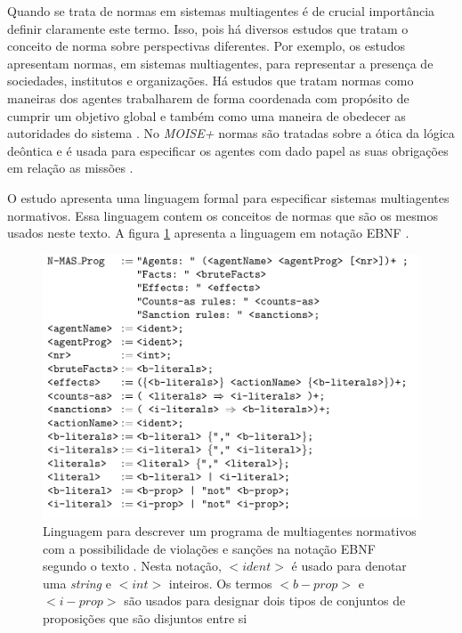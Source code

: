 Quando se trata de normas em sistemas multiagentes é de crucial importância definir claramente este termo. Isso, pois há diversos estudos que tratam o conceito de norma sobre perspectivas diferentes. Por exemplo, os estudos \cite{formalizeagent} \cite{formalizeagent2} apresentam normas, em sistemas multiagentes, para representar a presença de sociedades, institutos e organizações. Há estudos que tratam normas como maneiras dos agentes trabalharem de forma coordenada com propósito de cumprir um objetivo global e também como uma maneira de obedecer as autoridades do sistema \cite{modelingnormsforautnomousagent} \cite{amodelmultiagentsystemdynamicrelationship}. No \textit{MOISE+} normas são tratadas sobre a ótica da lógica deôntica e é usada para especificar os agentes com dado papel as suas obrigações em relação as missões \cite{moiseframework} \cite{moiseframeworktwo}.

O estudo \cite{dastaniframework} apresenta uma linguagem formal para especificar sistemas multiagentes normativos. Essa linguagem contem os conceitos de normas que são os mesmos usados neste texto. A figura \ref{descreveprograma} apresenta a linguagem em notação EBNF \cite{dastaniframework}.

\begin{figure}[H]
  \centering
  \includegraphics[width=0.8\linewidth]{figure/masprogram.png} 
  \caption{Linguagem para descrever um programa de multiagentes normativos com a possibilidade de violações e sanções na notação EBNF segundo o texto \cite{dastaniframework}. Nesta notação, $<ident>$ é usado para denotar uma \textit{string} e $<int>$ inteiros. Os termos $<b-prop>$ e $<i-prop>$ são usados para designar dois tipos de conjuntos de proposições que são disjuntos entre si}
  \label{descreveprograma}
\end{figure}


